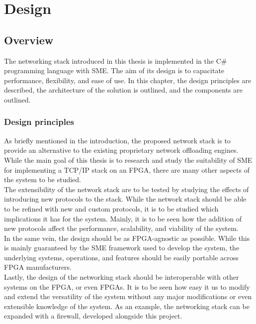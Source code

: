 \chapter{Design}
\label{chap:design}

\section{Overview}
The networking stack introduced in this thesis is implemented in the C\#
programming language with SME. The aim of its design is to capacitate performance,
flexibility, and ease of use. In this chapter, the design principles are
described, the architecture of the solution is outlined, and the components are
outlined.


\subsection{Design principles}
As briefly mentioned in the introduction, the proposed network stack is to
provide an alternative to the existing proprietary network offloading engines.
While the main goal of this thesis is to research and study the suitability of
SME for implementing a TCP/IP stack on an FPGA, there are many other aspects of the
system to be studied.\\
The extensibility of the network stack are to be tested by studying the effects
of introducing new protocols to the stack. While the network stack should be
able to be refined with new and custom protocols, it is to be studied which
implications it has for the system. Mainly, it is to be seen how the addition
of new protocols affect the performance, scalability, and viability of the
system.\\
In the same vein, the design should be as FPGA-agnostic as possible. While this is
mainly guaranteed by the SME framework used to develop the system, the underlying
systems, operations, and features should be easily portable across FPGA manufacturers.\\
Lastly, the design of the networking stack should be interoperable with other
systems on the FPGA, or even FPGAs. It is to be seen how easy it us to modify
and extend the versatility of the system without any major modifications or
even extensible knowledge of the system. As an example, the networking stack
can be expanded with a firewall, developed alongside this project.

